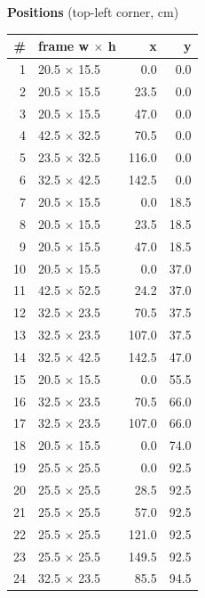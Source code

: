 \documentclass[a4paper,landscape,10pt]{article}
\begin{document}
\begin{minipage}[t]{0.25\textwidth}
\vspace{8pt}
{\bfseries Positions} (top-left corner, cm)\\[2pt]
\tiny
\begin{tabular}{@{}r l r r@{}}
\toprule
\# & frame w $\times$ h & x & y \\
\midrule
1 & 20.5 $\times$ 15.5 & 0.0 & 0.0 \\
2 & 20.5 $\times$ 15.5 & 23.5 & 0.0 \\
3 & 20.5 $\times$ 15.5 & 47.0 & 0.0 \\
4 & 42.5 $\times$ 32.5 & 70.5 & 0.0 \\
5 & 23.5 $\times$ 32.5 & 116.0 & 0.0 \\
6 & 32.5 $\times$ 42.5 & 142.5 & 0.0 \\
7 & 20.5 $\times$ 15.5 & 0.0 & 18.5 \\
8 & 20.5 $\times$ 15.5 & 23.5 & 18.5 \\
9 & 20.5 $\times$ 15.5 & 47.0 & 18.5 \\
10 & 20.5 $\times$ 15.5 & 0.0 & 37.0 \\
11 & 42.5 $\times$ 52.5 & 24.2 & 37.0 \\
12 & 32.5 $\times$ 23.5 & 70.5 & 37.5 \\
13 & 32.5 $\times$ 23.5 & 107.0 & 37.5 \\
14 & 32.5 $\times$ 42.5 & 142.5 & 47.0 \\
15 & 20.5 $\times$ 15.5 & 0.0 & 55.5 \\
16 & 32.5 $\times$ 23.5 & 70.5 & 66.0 \\
17 & 32.5 $\times$ 23.5 & 107.0 & 66.0 \\
18 & 20.5 $\times$ 15.5 & 0.0 & 74.0 \\
19 & 25.5 $\times$ 25.5 & 0.0 & 92.5 \\
20 & 25.5 $\times$ 25.5 & 28.5 & 92.5 \\
21 & 25.5 $\times$ 25.5 & 57.0 & 92.5 \\
22 & 25.5 $\times$ 25.5 & 121.0 & 92.5 \\
23 & 25.5 $\times$ 25.5 & 149.5 & 92.5 \\
24 & 32.5 $\times$ 23.5 & 85.5 & 94.5 \\
\bottomrule
\end{tabular}
\end{minipage}
\clearpage
\end{document}
